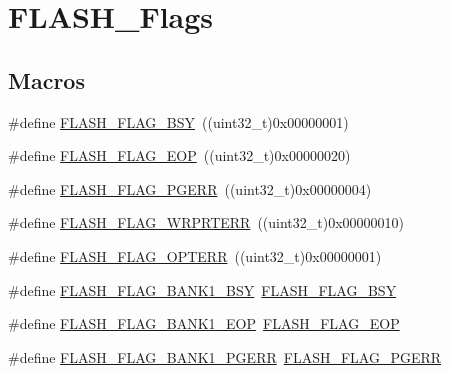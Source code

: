 \hypertarget{group___f_l_a_s_h___flags}{}\section{F\+L\+A\+S\+H\+\_\+\+Flags}
\label{group___f_l_a_s_h___flags}
\subsection*{Macros}
\begin{DoxyCompactItemize}
\item 
\#define \mbox{\hyperlink{group___f_l_a_s_h___flags_gad3bc368f954ad7744deda3315da2fff7}{F\+L\+A\+S\+H\+\_\+\+F\+L\+A\+G\+\_\+\+B\+SY}}~((uint32\+\_\+t)0x00000001)
\item 
\#define \mbox{\hyperlink{group___f_l_a_s_h___flags_gaf043ba4d8f837350bfc7754a99fae5a9}{F\+L\+A\+S\+H\+\_\+\+F\+L\+A\+G\+\_\+\+E\+OP}}~((uint32\+\_\+t)0x00000020)
\item 
\#define \mbox{\hyperlink{group___f_l_a_s_h___flags_gae2ef62dee0a5ca01e6226746039b6f20}{F\+L\+A\+S\+H\+\_\+\+F\+L\+A\+G\+\_\+\+P\+G\+E\+RR}}~((uint32\+\_\+t)0x00000004)
\item 
\#define \mbox{\hyperlink{group___f_l_a_s_h___flags_ga5c59a7f07507cac38091275964d3d35d}{F\+L\+A\+S\+H\+\_\+\+F\+L\+A\+G\+\_\+\+W\+R\+P\+R\+T\+E\+RR}}~((uint32\+\_\+t)0x00000010)
\item 
\#define \mbox{\hyperlink{group___f_l_a_s_h___flags_gac36b0605df97c9414933369a32251e4a}{F\+L\+A\+S\+H\+\_\+\+F\+L\+A\+G\+\_\+\+O\+P\+T\+E\+RR}}~((uint32\+\_\+t)0x00000001)
\item 
\#define \mbox{\hyperlink{group___f_l_a_s_h___flags_ga1f85e6d511503886e9fbe7d0228c97a4}{F\+L\+A\+S\+H\+\_\+\+F\+L\+A\+G\+\_\+\+B\+A\+N\+K1\+\_\+\+B\+SY}}~\mbox{\hyperlink{group___f_l_a_s_h___flags_gad3bc368f954ad7744deda3315da2fff7}{F\+L\+A\+S\+H\+\_\+\+F\+L\+A\+G\+\_\+\+B\+SY}}
\item 
\#define \mbox{\hyperlink{group___f_l_a_s_h___flags_gafa7670ee5ce8a2eb1f64c458a9f08e5b}{F\+L\+A\+S\+H\+\_\+\+F\+L\+A\+G\+\_\+\+B\+A\+N\+K1\+\_\+\+E\+OP}}~\mbox{\hyperlink{group___f_l_a_s_h___flags_gaf043ba4d8f837350bfc7754a99fae5a9}{F\+L\+A\+S\+H\+\_\+\+F\+L\+A\+G\+\_\+\+E\+OP}}
\item 
\#define \mbox{\hyperlink{group___f_l_a_s_h___flags_gaa1056ffdd1c434a2967d5ed7c0d263be}{F\+L\+A\+S\+H\+\_\+\+F\+L\+A\+G\+\_\+\+B\+A\+N\+K1\+\_\+\+P\+G\+E\+RR}}~\mbox{\hyperlink{group___f_l_a_s_h___flags_gae2ef62dee0a5ca01e6226746039b6f20}{F\+L\+A\+S\+H\+\_\+\+F\+L\+A\+G\+\_\+\+P\+G\+E\+RR}}

\end{DoxyCompactItemize}
